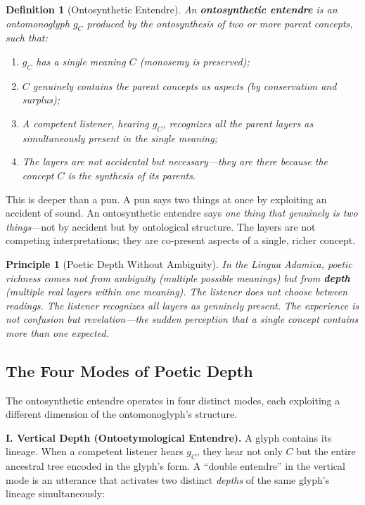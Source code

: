 \documentclass[12pt, letterpaper]{book}
\def\mathfrak#1{#1}%
\newtheorem{definition}{Definition}[chapter]
\newtheorem{principle}{Principle}[chapter]
\begin{document}
\begin{definition}[Ontosynthetic Entendre]\label{def:entendre}
An \textbf{ontosynthetic entendre} is an ontomonoglyph $\mathfrak{g}_C$ produced by the ontosynthesis of two or more parent concepts, such that:
\begin{enumerate}[label=(\roman*)]
    \item $\mathfrak{g}_C$ has a single meaning $C$ (monosemy is preserved);
    \item $C$ \textit{genuinely contains} the parent concepts as aspects (by conservation and surplus);
    \item A competent listener, hearing $\mathfrak{g}_C$, recognizes all the parent layers as \textit{simultaneously present} in the single meaning;
    \item The layers are not accidental but \textit{necessary}---they are there because the concept $C$ is the synthesis of its parents.
\end{enumerate}
\end{definition}

This is deeper than a pun. A pun says two things at once by exploiting an accident of sound. An ontosynthetic entendre says \textit{one thing that genuinely is two things}---not by accident but by ontological structure. The layers are not competing interpretations; they are co-present aspects of a single, richer concept.

\begin{principle}[Poetic Depth Without Ambiguity]\label{pr:poetic}
In the Lingua Adamica, poetic richness comes not from ambiguity (multiple possible meanings) but from \textbf{depth} (multiple real layers within one meaning). The listener does not \textit{choose} between readings. The listener \textit{recognizes} all layers as genuinely present. The experience is not confusion but \textit{revelation}---the sudden perception that a single concept contains more than one expected.
\end{principle}


\subsection{The Four Modes of Poetic Depth}

The ontosynthetic entendre operates in four distinct modes, each exploiting a different dimension of the ontomonoglyph's structure.

\textbf{I. Vertical Depth (Ontoetymological Entendre).} A glyph contains its lineage. When a competent listener hears $\mathfrak{g}_C$, they hear not only $C$ but the entire ancestral tree encoded in the glyph's form. A ``double entendre'' in the vertical mode is an utterance that activates two distinct \textit{depths} of the same glyph's lineage simultaneously:
\end{document}
